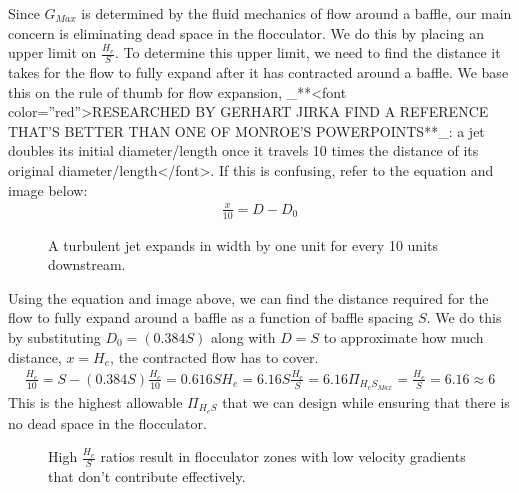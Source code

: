 \documentclass[letterpaper,10pt,english]{sphinxmanual}
\let\sphinxpxdimen\pdfpxdimen\else\newdimen\sphinxpxdimen
\begin{document}
Since \(G_{Max}\) is determined by the fluid mechanics of flow around a baffle, our main concern is eliminating dead space in the flocculator. We do this by placing an upper limit on \(\frac{H_e}{S}\). To determine this upper limit, we need to find the distance it takes for the flow to fully expand after it has contracted around a baffle. We base this on the rule of thumb for flow expansion, \_**\textless{}font color=”red”\textgreater{}RESEARCHED BY GERHART JIRKA FIND A REFERENCE THAT’S BETTER THAN ONE OF MONROE’S POWERPOINTS**\_: a jet doubles its initial diameter/length once it travels 10 times the distance of its original diameter/length\textless{}/font\textgreater{}. If this is confusing, refer to the equation and image below:
\begin{equation}\label{equation:Flocculation/Floc_Design:Flocculation/Floc_Design:11}
\begin{split}\frac{x}{10} = D - D_0\end{split}
\end{equation}
\begin{figure}[htbp]
\centering
\capstart

\noindent\sphinxincludegraphics[width=400\sphinxpxdimen]{{Jet_expansion_flocculator}.jpg}
\caption{A turbulent jet expands in width by one unit for every 10 units downstream.}\label{\detokenize{Flocculation/Floc_Design:id7}}\label{\detokenize{Flocculation/Floc_Design:figure-jet-expansion-flocculator}}\end{figure}

Using the equation and image above, we can find the distance required for the flow to fully expand around a baffle as a function of baffle spacing \(S\). We do this by substituting  \(D_0 = (0.384 S)\) along with \(D = S\) to approximate how much distance, \(x = H_e\), the contracted flow has to cover.
\begin{equation}\label{equation:Flocculation/Floc_Design:Flocculation/Floc_Design:12}
\begin{split}\frac{H_e}{10} = S - (0.384 S)
\frac{H_e}{10} = 0.616 S
H_e = 6.16S
\frac{H_e}{S} = 6.16
\Pi_{H_eS_{Max}} = \frac{H_e}{S} = 6.16 \approx 6\end{split}
\end{equation}
This is the highest allowable \(\Pi_{H_eS}\) that we can design while ensuring that there is no dead space in the flocculator.

\begin{figure}[htbp]
\centering
\capstart

\noindent{}
\caption{High \(\frac{H_e}{S}\) ratios result in flocculator zones with low velocity gradients that don’t contribute effectively.}\label{\detokenize{Flocculation/Floc_Design:id8}}\label{\detokenize{Flocculation/Floc_Design:figure-cfd-baffle-image}}\end{figure}
\end{document}
